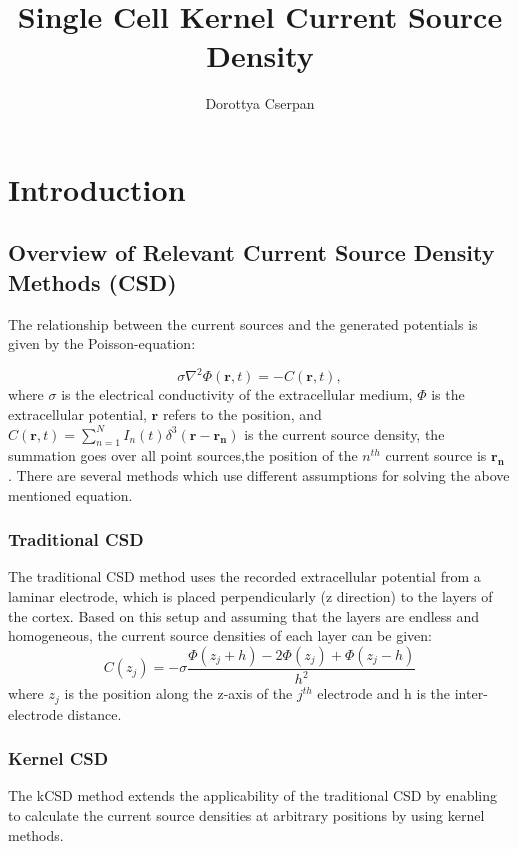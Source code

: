 \documentclass[12pt,a4paper]{article}
\author{Dorottya Cserpan}
\title{Single Cell Kernel Current Source Density}
\begin{document}
\maketitle

\section{Introduction}


\subsection{Overview of Relevant Current Source Density Methods (CSD)}
The relationship between the current sources and the generated potentials is given by the Poisson-equation:

\begin{equation}
 \sigma \nabla^2 \Phi(\mathbf{r},t )= -C(\mathbf{r},t),
\label{eq:poisson1}
\end{equation} 
where $\sigma$ is the electrical conductivity of the extracellular medium, $\Phi$ is the 
extracellular potential, $\mathbf{r}$ refers to the position, and 
$C(\mathbf{r},t)= \sum_{n=1}^N I_n (t) \delta^3(\mathbf{r}-\mathbf{r_n}) $
 is the current source density, the summation goes over all point sources,the position of the $n^{th}$ current source is $\mathbf{r_n}$ . There are several methods which use different assumptions for solving the above mentioned equation. 

\subsubsection{Traditional CSD}
The traditional CSD method \cite{Nicholson} uses the recorded extracellular potential from a laminar electrode, which is placed perpendicularly (z direction) to the layers of the cortex. Based on this setup and assuming that the layers are endless and homogeneous, the current source densities of each layer can be given:
\begin{equation}
C(z_j)= - \sigma \frac{\Phi(z_j+h)-2\Phi(z_j)+\Phi(z_j-h)}{h^2}
\end{equation}
 where $z_j$ is the position along the z-axis of the $j^{th}$ electrode and h is the inter-electrode distance.
\subsubsection{Kernel CSD}
The kCSD method \cite{DanielW} extends the applicability of the traditional CSD by enabling to calculate the current source densities at arbitrary positions by using kernel methods. 
\end{document}
